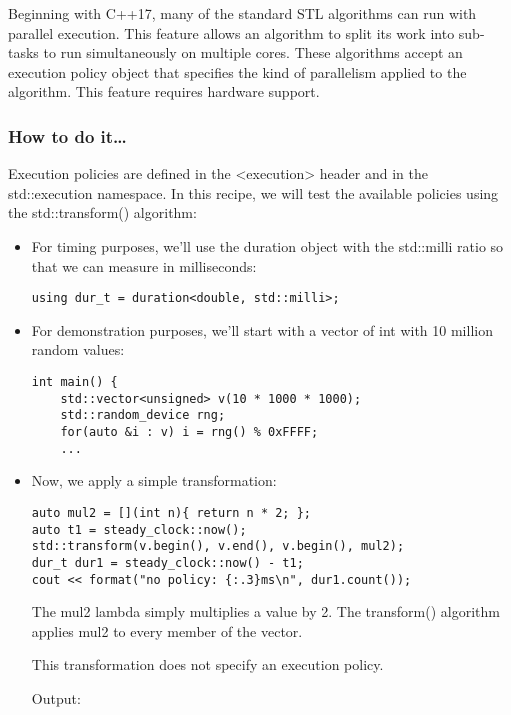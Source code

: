 
Beginning with C++17, many of the standard STL algorithms can run with parallel execution. This feature allows an algorithm to split its work into sub-tasks to run simultaneously on multiple cores. These algorithms accept an execution policy object that specifies the kind of parallelism applied to the algorithm. This feature requires hardware support.

\subsubsection{How to do it…}

Execution policies are defined in the <execution> header and in the std::execution namespace. In this recipe, we will test the available policies using the std::transform() algorithm:

\begin{itemize}
\item 
For timing purposes, we'll use the duration object with the std::milli ratio so that we can measure in milliseconds:

\begin{lstlisting}[style=styleCXX]
using dur_t = duration<double, std::milli>;
\end{lstlisting}

\item 
For demonstration purposes, we'll start with a vector of int with 10 million random values:

\begin{lstlisting}[style=styleCXX]
int main() {
	std::vector<unsigned> v(10 * 1000 * 1000);
	std::random_device rng;
	for(auto &i : v) i = rng() % 0xFFFF;
	...
\end{lstlisting}

\item 
Now, we apply a simple transformation:

\begin{lstlisting}[style=styleCXX]
auto mul2 = [](int n){ return n * 2; };
auto t1 = steady_clock::now();
std::transform(v.begin(), v.end(), v.begin(), mul2);
dur_t dur1 = steady_clock::now() - t1;
cout << format("no policy: {:.3}ms\n", dur1.count());
\end{lstlisting}

The mul2 lambda simply multiplies a value by 2. The transform() algorithm applies mul2 to every member of the vector.

This transformation does not specify an execution policy.

Output:


\end{itemize}
